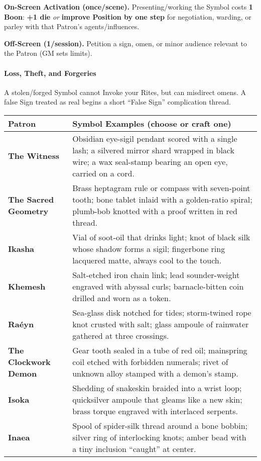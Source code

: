 \documentclass[12pt,twoside]{book}
\begin{document}
\textbf{On-Screen Activation (once/scene).} Presenting/working the Symbol costs \textbf{1 Boon}: \textbf{+1 die} \emph{or} \textbf{improve Position by one step} for negotiation, warding, or parley with that Patron’s agents/influences.

\textbf{Off-Screen (1/session).} Petition a sign, omen, or minor audience relevant to the Patron (GM sets limits).

\paragraph{Loss, Theft, and Forgeries}
A stolen/forged Symbol cannot Invoke your Rites, but can misdirect omens. A false Sign treated as real begins a short “False Sign” complication thread.

\begin{table}[htbp]
\centering
\small
\renewcommand{\arraystretch}{1.15}
\begin{tabular}{>{\bfseries}p{4.0cm} >{\raggedright\arraybackslash}p{10.8cm}}
\toprule
\textbf{Patron} & \textbf{Symbol Examples (choose or craft one)} \\
\midrule
The Witness & Obsidian eye-sigil pendant scored with a single lash; a silvered mirror shard wrapped in black wire; a wax seal-stamp bearing an open eye, carried on a cord. \\
The Sacred Geometry & Brass heptagram rule or compass with seven-point tooth; bone tablet inlaid with a golden-ratio spiral; plumb-bob knotted with a proof written in red thread. \\
Ikasha & Vial of soot-oil that drinks light; knot of black silk whose shadow forms a sigil; fingerbone ring lacquered matte, always cool to the touch. \\
Khemesh & Salt-etched iron chain link; lead sounder-weight engraved with abyssal curls; barnacle-bitten coin drilled and worn as a token. \\
Raéyn & Sea-glass disk notched for tides; storm-twined rope knot crusted with salt; glass ampoule of rainwater gathered at three crossings. \\
The Clockwork Demon & Gear tooth sealed in a tube of red oil; mainspring coil etched with forbidden numerals; rivet of unknown alloy stamped with a demon’s stamp. \\
Isoka & Shedding of snakeskin braided into a wrist loop; quicksilver ampoule that gleams like a new skin; brass torque engraved with interlaced serpents. \\
Inaea & Spool of spider-silk thread around a bone bobbin; silver ring of interlocking knots; amber bead with a tiny inclusion “caught” at center. \\

\end{tabular}
\end{table}
\end{document}
